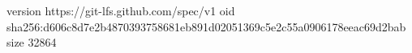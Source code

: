 version https://git-lfs.github.com/spec/v1
oid sha256:d606c8d7e2b4870393758681eb891d02051369c5e2c55a0906178eeac69d2bab
size 32864
